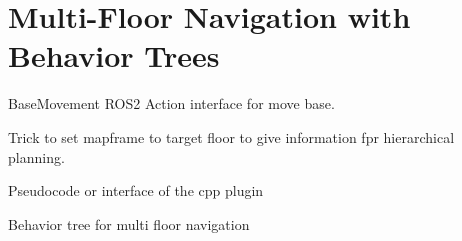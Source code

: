 
\section{Multi-Floor Navigation with Behavior Trees}
\label{sec:multi_floor_behavior_trees}

BaseMovement ROS2 Action interface for move base.

Trick to set mapframe to target floor to give information fpr hierarchical planning.

Pseudocode or interface of the cpp plugin

Behavior tree for multi floor navigation


